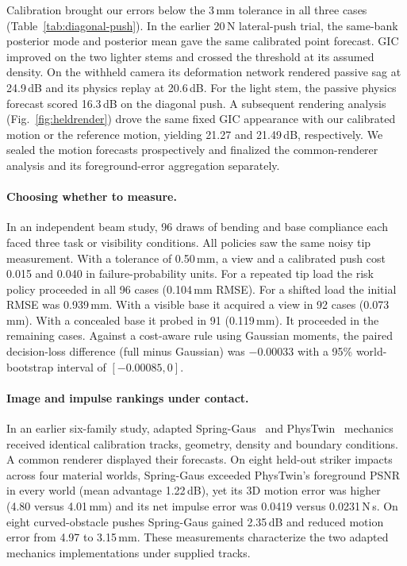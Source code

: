 Calibration brought our errors below the 3\,mm tolerance in all three cases (Table~\ref{tab:diagonal-push}). In the earlier 20\,N lateral-push trial, the same-bank posterior mode and posterior mean gave the same calibrated point forecast. GIC improved on the two lighter stems and crossed the threshold at its assumed density. On the withheld camera its deformation network rendered passive sag at 24.9\,dB and its physics replay at 20.6\,dB. For the light stem, the passive physics forecast scored 16.3\,dB on the diagonal push. A subsequent rendering analysis (Fig.~\ref{fig:heldrender}) drove the same fixed GIC appearance with our calibrated motion or the reference motion, yielding 21.27 and 21.49\,dB, respectively. We sealed the motion forecasts prospectively and finalized the common-renderer analysis and its foreground-error aggregation separately.

\paragraph{Choosing whether to measure.}
In an independent beam study, 96 draws of bending and base compliance each faced three task or visibility conditions. All policies saw the same noisy tip measurement. With a tolerance of 0.50\,mm, a view and a calibrated push cost 0.015 and 0.040 in failure-probability units. For a repeated tip load the risk policy proceeded in all 96 cases (0.104\,mm RMSE). For a shifted load the initial RMSE was 0.939\,mm. With a visible base it acquired a view in 92 cases (0.073\,mm). With a concealed base it probed in 91 (0.119\,mm). It proceeded in the remaining cases. Against a cost-aware rule using Gaussian moments, the paired decision-loss difference (full minus Gaussian) was $-0.00033$ with a 95\% world-bootstrap interval of $[-0.00085,0]$.

\paragraph{Image and impulse rankings under contact.}
In an earlier six-family study, adapted Spring-Gaus~\cite{zhong2024springgaus} and PhysTwin~\cite{jiang2025phystwin} mechanics received identical calibration tracks, geometry, density and boundary conditions. A common renderer displayed their forecasts. On eight held-out striker impacts across four material worlds, Spring-Gaus exceeded PhysTwin's foreground PSNR in every world (mean advantage 1.22\,dB), yet its 3D motion error was higher (4.80 versus 4.01\,mm) and its net impulse error was 0.0419 versus 0.0231\,N\,s. On eight curved-obstacle pushes Spring-Gaus gained 2.35\,dB and reduced motion error from 4.97 to 3.15\,mm. These measurements characterize the two adapted mechanics implementations under supplied tracks.

